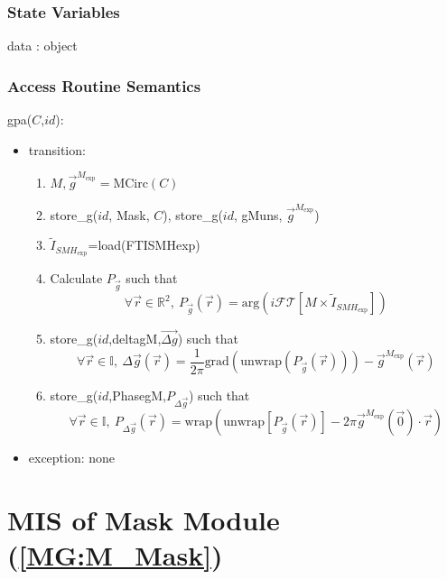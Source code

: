 \documentclass[12pt, titlepage]{article}
\begin{document}
\subsubsection{State Variables}

data : object

\subsubsection{Access Routine Semantics}

\noindent gpa($C$,$id$):
\begin{itemize} 
\item transition: 
	\begin{enumerate}
	\item $M,\overrightarrow{g}^{M_{\text{exp}}}=\text{MCirc}(C)$
	\item store{\_}g($id$, Mask, $C$), store{\_}g($id$, gMuns, 
$\overrightarrow{g}^{M_{\text{exp}}}$)
	\item $\widetilde{I}_{\mathit{SMH}_{\text{exp}}}$=load(FTISMHexp)
	\item Calculate $P_{\vec{g}}$ such that
	\begin{equation*}
	\forall \vec{r} \in \mathbb{R}^2, \ 
P_{\vec{g}}(\vec{r})=\text{arg}(i\mathcal{FT}[M\times\widetilde{I}_{\mathit{SMH}_{\text{exp}}}])
	\end{equation*}
	\item store{\_}g($id$,deltagM,$\overrightarrow{\Delta g}$) such that
	\begin{equation*}
	\forall \vec{r} \in \mathbb{I}, \ \Delta 
\overrightarrow{g}(\vec{r})=\frac{1}{2\pi}\text{grad}(\text{unwrap}(P_{\vec{g}}(\vec{r})))-\overrightarrow{g}^{M_{\text{exp}}}(\vec{r})
	\end{equation*}
	\item store{\_}g($id$,PhasegM,$P_{\Delta \vec{g}}$) such that
	\begin{equation*}
	\forall \vec{r} \in \mathbb{I}, \ P_{\Delta 
\vec{g}}(\vec{r})=\text{wrap}(\text{unwrap}[P_{\vec{g}}(\vec{r})]-2\pi\overrightarrow{g}^{M_{\text{exp}}}(\vec{0})\cdot 
\vec{r})
	\end{equation*}
	\end{enumerate}
\item exception: none
\end{itemize}

\section{MIS of Mask Module (\texorpdfstring{\cref{MG:M_Mask}}))} 
\label{MIS_Mask}
\end{document}
